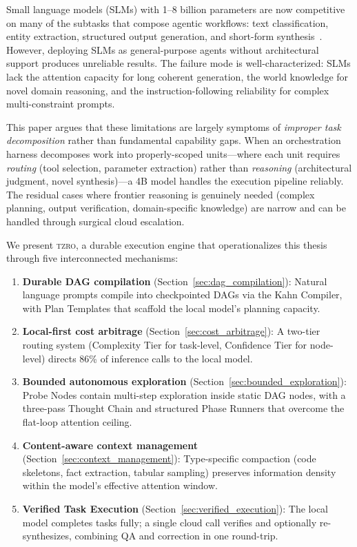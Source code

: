 \documentclass{article}
\begin{document}
Small language models (SLMs) with 1--8 billion parameters are now competitive on many of the subtasks that compose agentic workflows: text classification, entity extraction, structured output generation, and short-form synthesis~\cite{phi3technical2024,llama3herd2024}.
However, deploying SLMs as general-purpose agents without architectural support produces unreliable results.
The failure mode is well-characterized: SLMs lack the attention capacity for long coherent generation, the world knowledge for novel domain reasoning, and the instruction-following reliability for complex multi-constraint prompts.

This paper argues that these limitations are largely symptoms of \emph{improper task decomposition} rather than fundamental capability gaps.
When an orchestration harness decomposes work into properly-scoped units---where each unit requires \emph{routing} (tool selection, parameter extraction) rather than \emph{reasoning} (architectural judgment, novel synthesis)---a 4B model handles the execution pipeline reliably.
The residual cases where frontier reasoning is genuinely needed (complex planning, output verification, domain-specific knowledge) are narrow and can be handled through surgical cloud escalation.

We present \textsc{tzro}, a durable execution engine that operationalizes this thesis through five interconnected mechanisms:

\begin{enumerate}[leftmargin=*]
\item \textbf{Durable DAG compilation} (Section~\ref{sec:dag_compilation}): Natural language prompts compile into checkpointed DAGs via the Kahn Compiler, with Plan Templates that scaffold the local model's planning capacity.
\item \textbf{Local-first cost arbitrage} (Section~\ref{sec:cost_arbitrage}): A two-tier routing system (Complexity Tier for task-level, Confidence Tier for node-level) directs 86\% of inference calls to the local model.
\item \textbf{Bounded autonomous exploration} (Section~\ref{sec:bounded_exploration}): Probe Nodes contain multi-step exploration inside static DAG nodes, with a three-pass Thought Chain and structured Phase Runners that overcome the flat-loop attention ceiling.
\item \textbf{Content-aware context management} (Section~\ref{sec:context_management}): Type-specific compaction (code skeletons, fact extraction, tabular sampling) preserves information density within the model's effective attention window.
\item \textbf{Verified Task Execution} (Section~\ref{sec:verified_execution}): The local model completes tasks fully; a single cloud call verifies and optionally re-synthesizes, combining QA and correction in one round-trip.
\end{enumerate}
\end{document}

